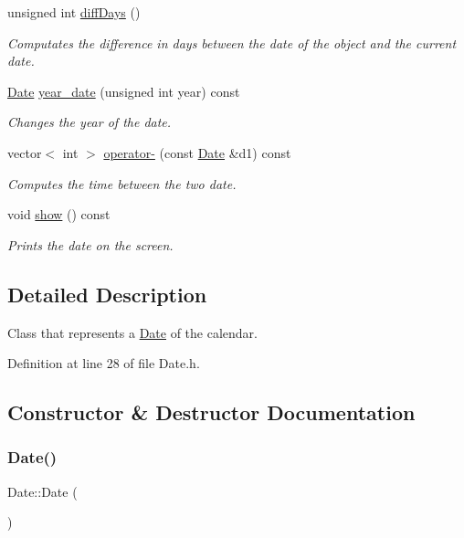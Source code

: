 \begin{DoxyCompactItemize}
unsigned int \hyperlink{class_date_a93d53878c07ee506c78971b762a47265}{diff\+Days} ()
\begin{DoxyCompactList}\small\item\em Computates the difference in days between the date of the object and the current date. \end{DoxyCompactList}\item 
\hyperlink{class_date}{Date} \hyperlink{class_date_a0ec9ecc48a4e5a4a582ff8344ae51acb}{year\+\_\+date} (unsigned int year) const
\begin{DoxyCompactList}\small\item\em Changes the year of the date. \end{DoxyCompactList}\item 
vector$<$ int $>$ \hyperlink{class_date_a23dcdfa5167af68543c2b1cd7bb0360f}{operator-\/} (const \hyperlink{class_date}{Date} \&d1) const
\begin{DoxyCompactList}\small\item\em Computes the time between the two date. \end{DoxyCompactList}\item 
void \hyperlink{class_date_a37f8fc7ca1692df7a8b265099c061721}{show} () const
\begin{DoxyCompactList}\small\item\em Prints the date on the screen. \end{DoxyCompactList}\end{DoxyCompactItemize}


\subsection{Detailed Description}
Class that represents a \hyperlink{class_date}{Date} of the calendar. 

Definition at line 28 of file Date.\+h.



\subsection{Constructor \& Destructor Documentation}
\hypertarget{class_date_a4e59ed4ba66eec61c27460c5d09fa1bd}{}\label{class_date_a4e59ed4ba66eec61c27460c5d09fa1bd} 
\subsubsection{\texorpdfstring{Date()}{Date()}\hspace{0.1cm}{\footnotesize\ttfamily [1/2]}}
{\footnotesize\ttfamily Date\+::\+Date (\begin{DoxyParamCaption}{ }\end{DoxyParamCaption})}



